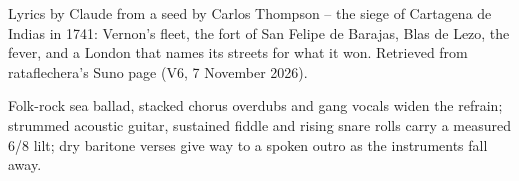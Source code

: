 
\label{sec:no-cartagena-square}
\begin{notes}
Lyrics by Claude from a seed by Carlos Thompson -- the siege of Cartagena de Indias in 1741: Vernon's fleet, the fort of San Felipe de Barajas, Blas de Lezo, the fever, and a London that names its streets for what it won. Retrieved from rataflechera's Suno page (V6, 7 November 2026).
\end{notes}
\begin{style}
Folk-rock sea ballad, stacked chorus overdubs and gang vocals widen the refrain; strummed acoustic guitar, sustained fiddle and rising snare rolls carry a measured 6/8 lilt; dry baritone verses give way to a spoken outro as the instruments fall away.
\end{style}
